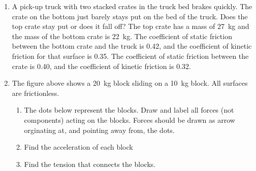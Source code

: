 \begin{enumerate}[itemsep=6pt]
\item A pick-up truck with two stacked crates in the truck bed brakes
  quickly. The crate on the bottom just barely stays put on the bed of the
  truck. Does the top crate stay put or does it fall off? The top crate has a
  mass of \SI{27}{\kilo\gram} and the mass of the bottom crate is
  \SI{22}{\kilo\gram}. The coefficient of static friction between the bottom
  crate and the truck is 0.42, and the coefficient of kinetic friction for
  that surface is 0.35. The coefficient of static friction between the crate
  is 0.40, and the coefficient of kinetic friction is 0.32.  
  \begin{center}
  \end{center}

\item The figure above shows a \SI{20}{\kilo\gram} block sliding on a
  \SI{10}{\kilo\gram} block. All surfaces are frictionless.
  \begin{enumerate}
  \item The dots below represent the blocks. Draw and label all forces (not
    components) acting on the blocks. Forces should be drawn as arrow
    orginating at, and pointing away from, the dots.
  \item Find the acceleration of each block    
  \item Find the tension that connects the blocks.
  \end{enumerate}
\end{enumerate}

